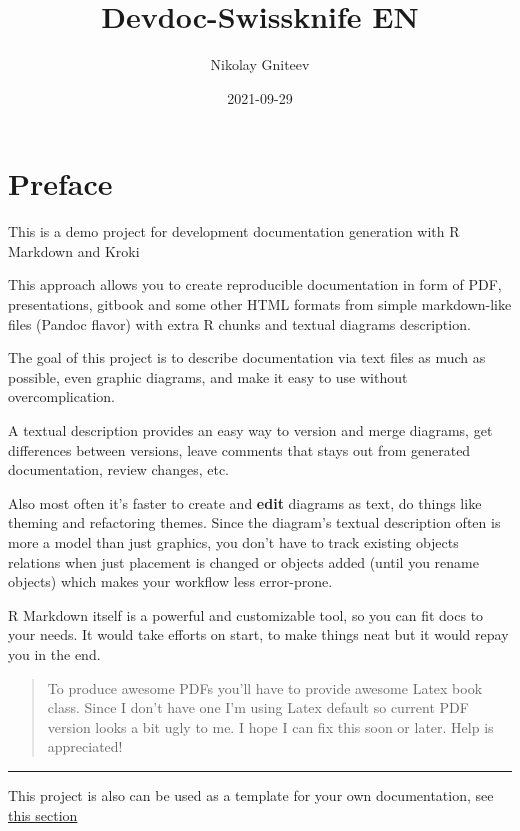 \documentclass[12pt,a4paper,12pt,oneside,openany]{book}
\title{Devdoc-Swissknife EN}
\author{Nikolay Gniteev}
\date{2021-09-29}
\begin{document}
\maketitle

{
\hypersetup{linkcolor=black}
\setcounter{tocdepth}{2}
\tableofcontents
}
\chapter*{Preface}\label{preface}


This is a demo project for development documentation generation with R Markdown and Kroki

This approach allows you to create reproducible documentation in form of PDF, presentations, gitbook and some other HTML formats from simple markdown-like files (Pandoc flavor) with extra R chunks and textual diagrams description.

The goal of this project is to describe documentation via text files as much as possible, even graphic diagrams, and make it easy to use without overcomplication.

A textual description provides an easy way to version and merge diagrams, get differences between versions, leave comments that stays out from generated documentation, review changes, etc.

Also most often it's faster to create and \textbf{edit} diagrams as text, do things like theming and refactoring themes. Since the diagram's textual description often is more a model than just graphics, you don't have to track existing objects relations when just placement is changed or objects added (until you rename objects) which makes your workflow less error-prone.

R Markdown itself is a powerful and customizable tool, so you can fit docs to your needs. It would take efforts on start, to make things neat but it would repay you in the end.

\begin{quote}
To produce awesome PDFs you'll have to provide awesome Latex book class. Since I don't have one I'm using Latex default so current PDF version looks a bit ugly to me. I hope I can fix this soon or later. Help is appreciated!
\end{quote}

\begin{center}\rule{0.5\linewidth}{\linethickness}\end{center}

This project is also can be used as a template for your own documentation, see \protect\hyperlink{as_template}{this section}
\end{document}
